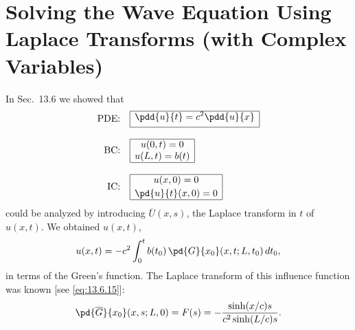 \section{Solving the Wave Equation Using Laplace Transforms (with Complex Variables)}
\label{sec:13.8}

In Sec.~13.6 we showed that
\begin{align}
\text{PDE:}\quad &
\begin{array}{|c|}
\hline
\displaystyle\pdd{u}{t} = c^2\pdd{u}{x} \\[4pt]
\hline
\end{array}
\label{eq:13.8.1} \\[8pt]
\text{BC:}\quad &
\begin{array}{|c|}
\hline
u(0,t) = 0 \\
u(L,t) = b(t) \\
\hline
\end{array}
\label{eq:13.8.2} \\[8pt]
\text{IC:}\quad &
\begin{array}{|c|}
\hline
u(x,0) = 0 \\[2pt]
\displaystyle\pd{u}{t}(x,0) = 0 \\
\hline
\end{array}
\label{eq:13.8.3}
\end{align}
could be analyzed by introducing $\overline{U}(x,s)$, the Laplace transform in $t$ of $u(x,t)$.  We obtained $u(x,t)$,
\begin{equation}
u(x,t) = -c^2\int_0^t b(t_0)\,\pd{G}{x_0}(x,t;L,t_0)\,dt_0,
\label{eq:13.8.4}
\end{equation}
in terms of the Green's function.  The Laplace transform of this influence function was known [see \eqref{eq:13.6.15}]:
\begin{equation}
\pd{\overline{G}}{x_0}(x,s;L,0) = F(s) = -\frac{\sinh(x/c)s}{c^2\sinh(L/c)s}.
\label{eq:13.8.5}
\end{equation}

